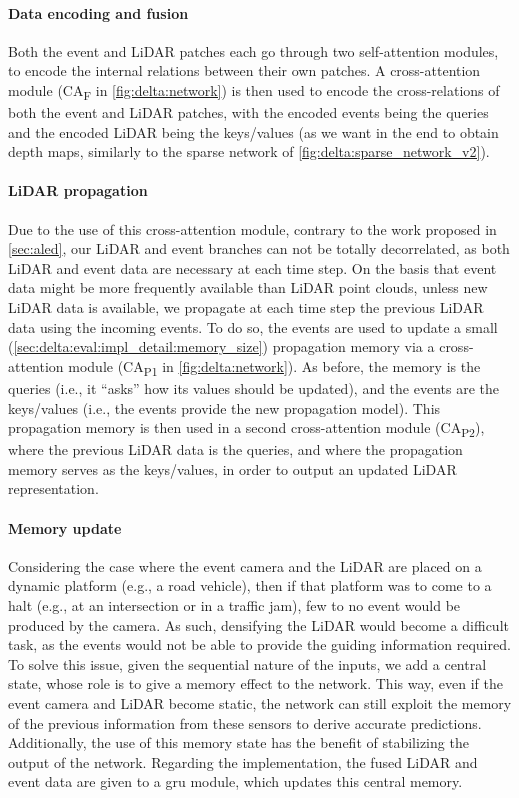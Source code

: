 \paragraph{Data encoding and fusion}
Both the event and LiDAR patches each go through two self-attention modules, to encode the internal relations between their own patches. A cross-attention module (CA\textsubscript{F} in \cref{fig:delta:network}) is then used to encode the cross-relations of both the event and LiDAR patches, with the encoded events being the queries and the encoded LiDAR being the keys/values (as we want in the end to obtain depth maps, similarly to the sparse network of \cref{fig:delta:sparse_network_v2}).

\paragraph{LiDAR propagation}
Due to the use of this cross-attention module, contrary to the work proposed in \cref{sec:aled}, our LiDAR and event branches can not be totally decorrelated, as both LiDAR and event data are necessary at each time step. On the basis that event data might be more frequently available than LiDAR point clouds, unless new LiDAR data is available, we propagate at each time step the previous LiDAR data using the incoming events. To do so, the events are used to update a small (\cref{sec:delta:eval:impl_detail:memory_size}) propagation memory via a cross-attention module (CA\textsubscript{P1} in \cref{fig:delta:network}). As before, the memory is the queries (i.e., it ``asks'' how its values should be updated), and the events are the keys/values (i.e., the events provide the new propagation model). This propagation memory is then used in a second cross-attention module (CA\textsubscript{P2}), where the previous LiDAR data is the queries, and where the propagation memory serves as the keys/values, in order to output an updated LiDAR representation.

\paragraph{Memory update}\label{sec:method:memory}
Considering the case where the event camera and the LiDAR are placed on a dynamic platform (e.g., a road vehicle), then if that platform was to come to a halt (e.g., at an intersection or in a traffic jam), few to no event would be produced by the camera. As such, densifying the LiDAR would become a difficult task, as the events would not be able to provide the guiding information required. To solve this issue, given the sequential nature of the inputs, we add a central state, whose role is to give a memory effect to the network. This way, even if the event camera and LiDAR become static, the network can still exploit the memory of the previous information from these sensors to derive accurate predictions. Additionally, the use of this memory state has the benefit of stabilizing the output of the network. Regarding the implementation, the fused LiDAR and event data are given to a \acrfull{gru} module, which updates this central memory.

